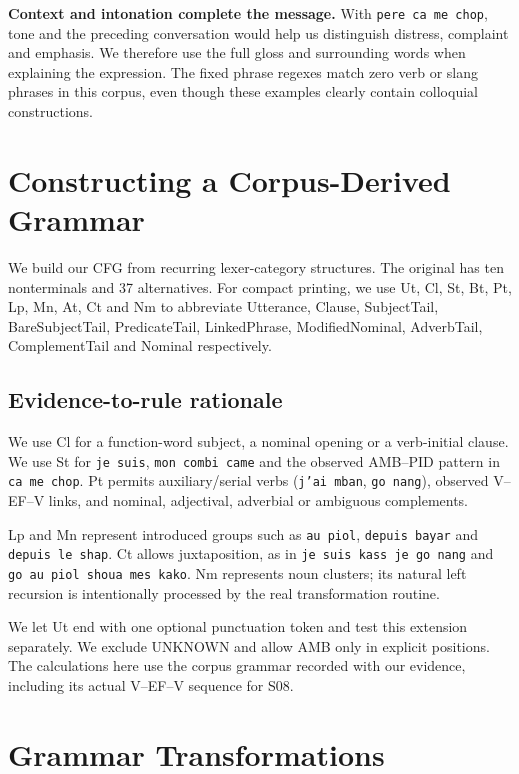 \documentclass[11pt]{article}
\newcommand{\code}[1]{\texttt{#1}}
\begin{document}
\textbf{Context and intonation complete the message.}
With \code{pere ca me chop}, tone and the preceding conversation would help
us distinguish distress, complaint and emphasis. We therefore use the full
gloss and surrounding words when explaining the expression. The fixed phrase
regexes match zero verb or slang phrases in this corpus, even though these
examples clearly contain colloquial constructions.

\clearpage
\section{Constructing a Corpus-Derived Grammar}
We build our CFG from recurring lexer-category structures. The original
has ten nonterminals and 37 alternatives. For compact printing, we use
Ut, Cl, St, Bt, Pt, Lp, Mn, At, Ct and Nm to abbreviate
Utterance, Clause, SubjectTail, BareSubjectTail, PredicateTail, LinkedPhrase,
ModifiedNominal, AdverbTail, ComplementTail and Nominal respectively.

{\small\renewcommand{\arraystretch}{1.3}}

\subsection*{Evidence-to-rule rationale}
We use Cl for a function-word subject, a nominal opening or a verb-initial
clause. We use St for \code{je suis}, \code{mon combi came} and the observed
AMB--PID pattern in \code{ca me chop}. Pt permits auxiliary/serial verbs
(\code{j'ai mban}, \code{go nang}), observed V--EF--V links, and nominal,
adjectival, adverbial or ambiguous complements.

Lp and Mn represent introduced groups such as \code{au piol},
\code{depuis bayar} and \code{depuis le shap}. Ct allows juxtaposition, as in
\code{je suis kass je go nang} and \code{go au piol shoua mes kako}.
Nm represents noun clusters; its natural left recursion is intentionally
processed by the real transformation routine.

We let Ut end with one optional punctuation token and test this extension
separately. We exclude UNKNOWN and allow AMB only in explicit positions.
The calculations here use the corpus grammar recorded with our evidence,
including its actual V--EF--V sequence for S08.

\clearpage
\section{Grammar Transformations}
\end{document}

